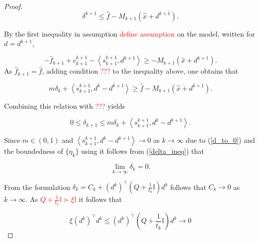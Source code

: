 \begin{proof}
\begin{equation}
	\delta^{k+1} \leq \hat{f}-M_{k+1}(\hat{x}+d^{k+1}).
\end{equation}

By the first inequality in assumption \textcolor{red}{define assumption} on the model, written for \(d=d^{k+1}\),

\begin{equation}
	-\hat{f}_{k+1}+c^{k+1}_{k+1}-\left\langle s^{k+1}_{k+1},d^{k+1}\right\rangle \geq -M_{k+1}(\hat{x}+d^{k+1}).
\end{equation}
As \(\hat{f}_{k+1}=\hat{f}\), adding condition \textcolor{red}{???} to the inequality above, one obtains that

\begin{equation}
	m\delta_k+\left\langle s^{k+1}_{k+1},d^k-d^{k+1}\right\rangle \geq \hat{f}-M_{k+1}(\hat{x}+d^{k+1}).
\end{equation}

Combining this relation with \textcolor{red}{???} yields

\begin{equation}
	0 \leq \delta_{k+1} \leq m\delta_k + \left\langle s^{k+1}_{k+1},d^k-d^{k+1}\right\rangle.
	\label{delta_ineq}
\end{equation}

Since \(m \in (0,1)\) and \(\left\langle s^{k+1}_{k+1},d^k-d^{k+1}\right\rangle \to 0\) as \(k \to \infty\) due to (\ref{d_to_0}) and the boundedness of \(\{\eta_k\}\) using \cite[Lemma 3, p.45]{Polyak1987} it follows from  (\ref{delta_ineq}) that 

\begin{equation}
	\lim_{k \to \infty} \delta_k = 0.
\end{equation}

From the formulation \(\delta_k = C_k + \left(d^k\right)^{\top}\left(Q+\frac{1}{t_k}\mathbb{I}\right)d^k\) follows that \(C_k \to 0\) as \(k \to \infty\). As \textcolor{red}{\(Q+\frac{1}{t_k}\mathbb{I} \succ \xi\mathbb{I}\)} it follows that 

\begin{equation}
	\xi \left(d^k\right)^{\top}d^k \leq \left(d^k\right)^{\top}\left(Q+\frac{1}{t_k}\mathbb{I}\right)d^k \to 0
\end{equation}

\end{proof}


